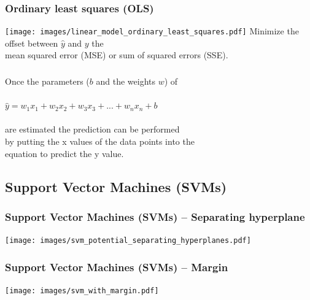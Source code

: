 \documentclass[aspectratio=169]{beamer}
\begin{document}
\begin{frame}
  \frametitle{Ordinary least squares (OLS)}
  \begin{center}
    \texttt{[image: images/linear\_model\_ordinary\_least\_squares.pdf]}
    Minimize the offset between $\hat{y}$ and $y$ the\\
    mean squared error (MSE) or sum of squared errors (SSE).
  \end{center}
\end{frame}


\begin{frame}
  \frametitle{}
  \begin{block}{}
    \begin{center}
      Once the parameters ($b$ and the weights $w$) of\\
      \ \\
      $\hat{y} = w_{1}x_{1} + w_{2}x_{2} + w_{3}x_{3} + ... + w_{n}x_{n} + b$\\
      \ \\
      are estimated the prediction can be performed\\
      by putting the x values of the data points into the\\
      equation to predict the y value.
    \end{center}
  \end{block}
\end{frame}

\subsection{Support Vector Machines (SVMs)}

\setcounter{tocdepth}{2}
\begin{frame}{}
   \tableofcontents[currentsubsection]
\end{frame}


\begin{frame}
  \frametitle{Support Vector Machines (SVMs) -- Separating hyperplane}
  \begin{center}
    \texttt{[image: images/svm\_potential\_separating\_hyperplanes.pdf]}
  \end{center}
\end{frame}

\begin{frame}
  \frametitle{Support Vector Machines (SVMs) -- Margin}
  \begin{center}
    \texttt{[image: images/svm\_with\_margin.pdf]}
  \end{center}
\end{frame}
\end{document}
